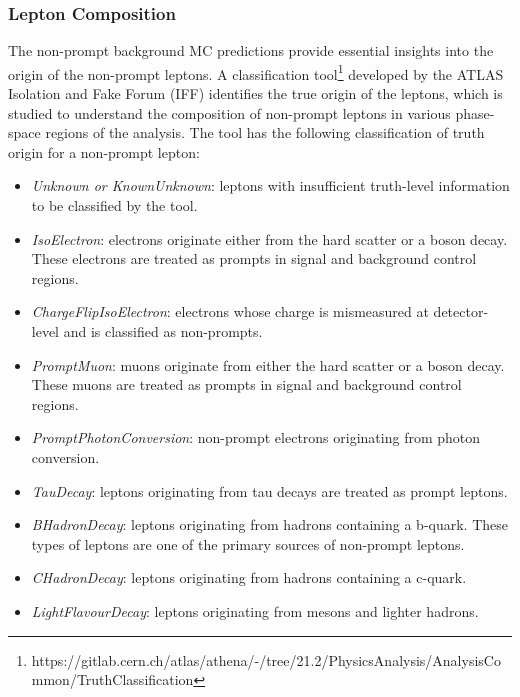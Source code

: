 \subsubsection{Lepton Composition}
\label{subsubsec:LepComp}
The non-prompt background MC predictions provide essential insights into the origin of the non-prompt leptons. A classification tool\footnote{https://gitlab.cern.ch/atlas/athena/-/tree/21.2/PhysicsAnalysis/AnalysisCommon/TruthClassification} developed by the ATLAS Isolation and Fake Forum (IFF) identifies the true origin of the leptons, which is studied to understand the composition of non-prompt leptons in various phase-space regions of the analysis. The tool has the following classification of truth origin for a non-prompt lepton:

\begin{itemize}
    \item{ \textit{Unknown or KnownUnknown}: leptons with insufficient truth-level information to be classified by the tool.}
 
    \item { \textit{IsoElectron}: electrons originate either from the hard scatter or a boson decay. These electrons are treated as prompts in signal and background control regions.}
    
    \item{ \textit{ChargeFlipIsoElectron}: electrons whose charge is mismeasured at detector-level and is classified as non-prompts.}
    
    \item{ \textit{PromptMuon}: muons originate from either the hard scatter or a boson decay. These muons are treated as prompts in signal and background control regions.}
    
    \item{\textit{PromptPhotonConversion}: non-prompt electrons originating from photon conversion. }
    
    \item{\textit{TauDecay}: leptons originating from tau decays are treated as prompt leptons.}
    
    \item{\textit{BHadronDecay}: leptons originating from hadrons containing a b-quark. These types of leptons are one of the primary sources of non-prompt leptons.}
    
    \item{\textit{CHadronDecay}: leptons originating from hadrons containing a c-quark.}
    
    \item{\textit{LightFlavourDecay}: leptons originating from mesons and lighter hadrons.}

\end{itemize}

